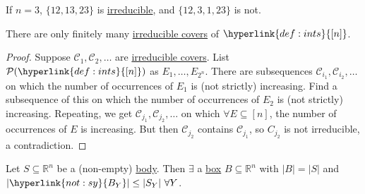 \documentclass{article}
\let\subset\subseteq
\begin{document}
\begin{eg}
  If $n=3$, $\{12,13,23\}$ is \hyperlink{def:irred}{irreducible}, and $\{12,3,1,23\}$ is not.
\end{eg}
\begin{nlemma}
  There are only finitely many \hyperlink{def:irred}{irreducible covers} of $\hyperlink{def:ints}{[n]}$.
\end{nlemma}
\begin{proof}
  Suppose $\mathcal{C}_1, \mathcal{C}_2, \dotsc$ are \hyperlink{def:irred}{irreducible covers}.
  List $\mathcal{P}(\hyperlink{def:ints}{[n]})$ as $E_1, \dotsc, E_{2^n}$.
  There are subsequences $\mathcal{C}_{i_1}, \mathcal{C}_{i_2}, \dotsc$ on which the number of occurrences of $E_1$ is (not strictly) increasing.
  Find a subsequence of this on which the number of occurrences of $E_2$ is (not strictly) increasing.
  Repeating, we get $\mathcal{C}_{j_1}, \mathcal{C}_{j_2}, \dotsc$ on which $\forall E \subseteq [n]$, the number of occurrences of $E$ is increasing.
  But then $\mathcal{C}_{j_2}$ contains $\mathcal{C}_{j_1}$, so $C_{j_2}$ is not irreducible, a contradiction.
\end{proof}
\begin{nthm}\label{thm:3.7}
  Let $S \subset \mathbb{R}^n$ be a (non-empty) \hyperlink{def:body}{body}.
  Then $\exists$ a \hyperlink{def:box}{box} $B \subset \mathbb{R}^n$ with $|B| = |S|$ and $|\hyperlink{not:sy}{B_Y}| \leq |S_Y|\ \forall Y$.
\end{nthm}
\end{document}
